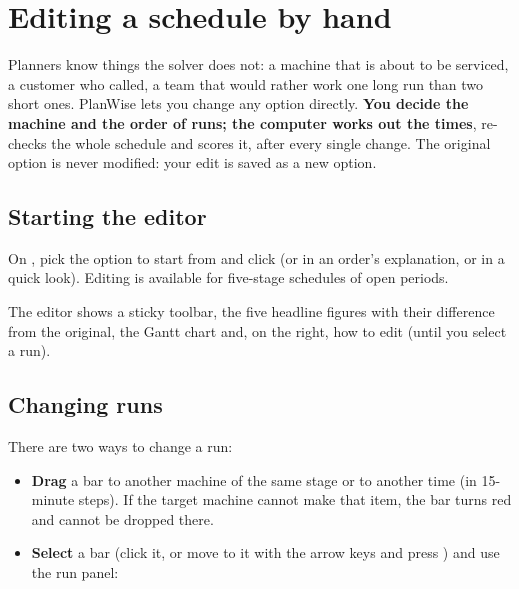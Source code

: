 \chapter{Editing a schedule by hand}\label{ch:editing}

Planners know things the solver does not: a machine that is about to be serviced, a customer who called, a
team that would rather work one long run than two short ones. PlanWise lets you change any option directly.
\textbf{You decide the machine and the order of runs; the computer works out the times}, re-checks the whole
schedule and scores it, after every single change. The original option is never modified: your edit is saved
as a new option.

\section{Starting the editor}

On , pick the option to start from and click  (or
 in an order's explanation, or  in a quick look). Editing is available for
five-stage schedules of open periods.


The editor shows a sticky toolbar, the five headline figures with their difference from the original, the
Gantt chart and, on the right, how to edit (until you select a run).

\section{Changing runs}\label{sec:edit-runs}

There are two ways to change a run:

\begin{itemize}
  \item \textbf{Drag} a bar to another machine of the same stage or to another time (in 15-minute steps). If
        the target machine cannot make that item, the bar turns red and cannot be dropped there.
  \item \textbf{Select} a bar (click it, or move to it with the arrow keys and press ) and use the
        run panel:
\end{itemize}


